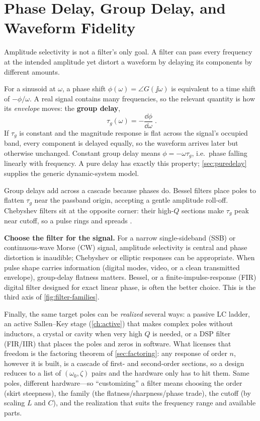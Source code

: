 \section{Phase Delay, Group Delay, and Waveform Fidelity}
\label{sec:groupdelay}
Amplitude selectivity is not a filter's only goal. A filter can pass every frequency
at the intended amplitude yet distort a waveform by delaying its components by
different amounts.

For a sinusoid at \(\omega\), a phase shift \(\phi(\omega)=\angle G(\jj\omega)\) is
equivalent to a time shift of \(-\phi/\omega\). A real signal contains many
frequencies, so the relevant quantity is how its \emph{envelope} moves: the
\textbf{group delay},
\[
\boxed{\;\tau_g(\omega)=-\frac{\dd\phi}{\dd\omega}\;}.
\]
If \(\tau_g\) is constant and the magnitude response is flat across the signal's
occupied band, every component is delayed equally, so the waveform arrives later but
otherwise unchanged. Constant group delay means
\(\phi=-\omega\tau_g\), i.e.\ phase falling linearly with frequency. A pure delay
has exactly this property; \cref{sec:puredelay} supplies the generic dynamic-system
model.

Group delays add across a cascade because phases do. Bessel filters place poles to
flatten \(\tau_g\) near the passband origin, accepting a gentle amplitude roll-off.
Chebyshev filters sit at the opposite corner: their high-\(Q\) sections make
\(\tau_g\) peak near cutoff, so a pulse rings and spreads
\cite[pp.~6, 209--211]{free2022rfmicrowave}.

\begin{physicalbox}
\textbf{Choose the filter for the signal.} For a narrow single-sideband (SSB) or
continuous-wave Morse (CW) signal, amplitude selectivity is central and phase
distortion is inaudible; Chebyshev or elliptic responses can be appropriate. When
pulse shape carries information (digital modes, video, or a clean transmitted
envelope), group-delay flatness matters. Bessel, or a finite-impulse-response (FIR)
digital filter designed for exact linear phase, is often the better choice. This is
the third axis of \cref{fig:filter-families}.
\end{physicalbox}

Finally, the same target poles can be \emph{realized} several ways: a passive LC
ladder, an active Sallen--Key stage (\cref{ch:active}) that makes complex poles
without inductors, a crystal or cavity when very high \(Q\) is needed, or a DSP
filter (FIR/IIR) that places the poles and zeros in software. What licenses that
freedom is the factoring theorem of \cref{sec:factoring}: any response of order
\(n\), however it is built, is a cascade of first- and second-order sections, so
a design reduces to a list of \((\omega_0,\zeta)\) pairs and the hardware only has
to hit them. Same poles, different hardware---so ``customizing'' a filter means choosing the order (skirt
steepness), the family (the flatness/sharpness/phase trade), the cutoff (by
scaling \(L\) and \(C\)), and the realization that suits the frequency range and
available parts.

